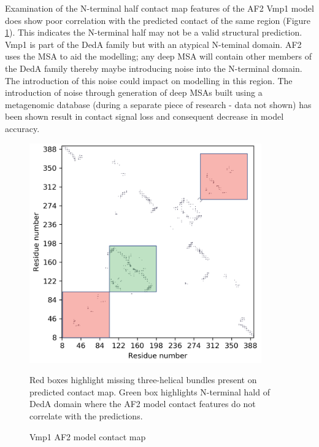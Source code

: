 Examination of the N-terminal half contact map features of the AF2 Vmp1 model does show poor correlation with the predicted contact of the same region (Figure \ref{fig:vmp1_af_cmap}).  This indicates the N-terminal half may not be a valid structural prediction.  Vmp1 is part of the DedA family but with an atypical N-teminal domain.  AF2 uses the MSA to aid the modelling; any deep MSA will contain other members of the DedA family thereby maybe introducing noise into the N-terminal domain.  The introduction of this noise could impact on modelling in this region.  The introduction of noise through generation of deep MSAs built using a metagenomic database (during a separate piece of research - data not shown) has been shown result in contact signal loss and consequent decrease in model accuracy.

\begin{figure}[th!]
    \centering
    \includegraphics[width=100mm, scale =0.5]{Results/af_vmp1_cmap.png}
    \caption{Vmp1 AF2 model contact map}
    \label{fig:vmp1_af_cmap}
    \small
    Red boxes highlight missing three-helical bundles present on predicted contact map. Green box highlights N-terminal hald of DedA domain where the AF2 model contact features do not correlate with the predictions.
\end{figure}


